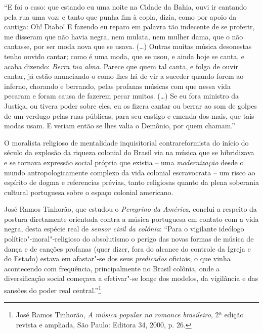 ``E foi o caso: que estando eu uma noite na Cidade da Bahia, ouvi ir
cantando pela rua uma voz: e tanto que punha fim à copla, dizia, como
por apoio da cantiga: Oh! Diabo! E fazendo eu reparo em palavra tão
indecente de se proferir, me disseram que não havia negra, nem mulata,
nem mulher dama, que o não cantasse, por ser moda nova que se usava.
(\ldots{}) Outras muitas música desonestas tenho ouvido cantar; como é uma
moda, que se usou, e ainda hoje se canta, e acaba dizendo: \emph{Berra
tua alma}. Parece que quem tal canta, e folga de ouvir cantar, já estão
anunciando o como lhes há de vir a suceder quando forem ao inferno,
chorando e berrando, pelas profanas músicas com que nessa vida pecaram e
foram causa de fazerem pecar muitos. (\ldots{}) Se eu fora ministro da
Justiça, ou tivera poder sobre eles, eu os fizera cantar ou berrar ao
som de golpes de um verdugo pelas ruas públicas, para seu castigo e
emenda dos mais, que tais modas usam. E veriam então se lhes valia o
Demônio, por quem chamam.''

O moralista religioso de mentalidade inquisitorial contrareformista do
início do século da explosão da riqueza colonial do Brasil via na música
que se hibridizava e se tornava expressão social própria que existia --
uma \emph{modernização} desde o mundo antropologicamente complexo da
vida colonial escravocrata -- um risco ao espírito de dogma e
referencias prévias, tanto religiosas quanto da plena soberania cultural
portuguesa sobre o espaço colonial americano.

José Ramos Tinhorão, que estudou o \emph{Peregrino da América}, conclui
a respeito da postura diretamente orientada contra a música portuguesa
em contato com a vida negra, desta espécie real de \emph{sensor civil da
colônia}: ``Para o vigilante ideólogo político"-moral"-religioso do
absolutismo o perigo das novas formas de música de dança e de canções
profanas (quer dizer, fora do alcance do controle da Igreja e do Estado)
estava em afastar"-se dos seus \emph{predicados} oficiais, o que vinha
acontecendo com frequência, principalmente no Brasil colônia, onde a
diversificação social começava a efetivar"-se longe dos modelos, da
vigilância e das sansões do poder real central.''\footnote{José Ramos
  Tinhorão, \emph{A música popular no romance brasileiro}, 2ª edição
  revista e ampliada, São Paulo: Editora 34, 2000, p. 26.}

